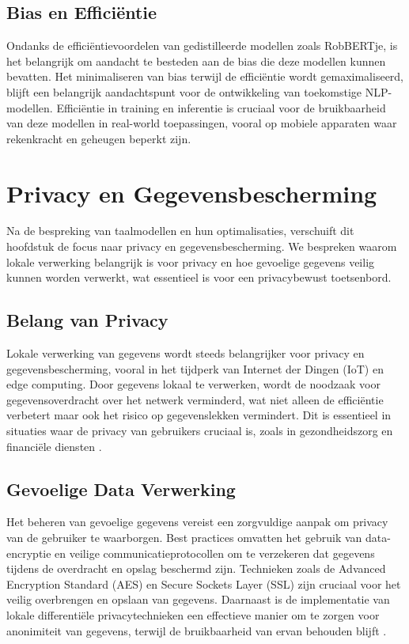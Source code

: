 \subsection{Bias en Efficiëntie}

Ondanks de efficiëntievoordelen van gedistilleerde modellen zoals RobBERTje, is het belangrijk om aandacht te besteden aan de bias die deze modellen kunnen bevatten. Het minimaliseren van bias terwijl de efficiëntie wordt gemaximaliseerd, blijft een belangrijk aandachtspunt voor de ontwikkeling van toekomstige NLP-modellen. Efficiëntie in training en inferentie is cruciaal voor de bruikbaarheid van deze modellen in real-world toepassingen, vooral op mobiele apparaten waar rekenkracht en geheugen beperkt zijn.


\section{Privacy en Gegevensbescherming}

Na de bespreking van taalmodellen en hun optimalisaties, verschuift dit hoofdstuk de focus naar privacy en gegevensbescherming. We bespreken waarom lokale verwerking belangrijk is voor privacy en hoe gevoelige gegevens veilig kunnen worden verwerkt, wat essentieel is voor een privacybewust toetsenbord.

\subsection{Belang van Privacy}

Lokale verwerking van gegevens wordt steeds belangrijker voor privacy en gegevensbescherming, vooral in het tijdperk van Internet der Dingen (IoT) en edge computing. Door gegevens lokaal te verwerken, wordt de noodzaak voor gegevensoverdracht over het netwerk verminderd, wat niet alleen de efficiëntie verbetert maar ook het risico op gegevenslekken vermindert. Dit is essentieel in situaties waar de privacy van gebruikers cruciaal is, zoals in gezondheidszorg en financiële diensten \autocite{Bi2020}.

\subsection{Gevoelige Data Verwerking}

Het beheren van gevoelige gegevens vereist een zorgvuldige aanpak om privacy van de gebruiker te waarborgen. Best practices omvatten het gebruik van data-encryptie en veilige communicatieprotocollen om te verzekeren dat gegevens tijdens de overdracht en opslag beschermd zijn. Technieken zoals de Advanced Encryption Standard (AES) en Secure Sockets Layer (SSL) zijn cruciaal voor het veilig overbrengen en opslaan van gegevens. Daarnaast is de implementatie van lokale differentiële privacytechnieken een effectieve manier om te zorgen voor anonimiteit van gegevens, terwijl de bruikbaarheid van ervan behouden blijft \autocite{Shah2014}.


